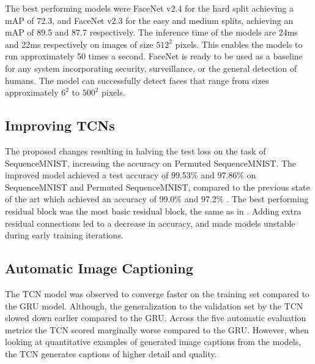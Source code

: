 \documentclass[a4paper, twoside]{article}
\begin{document}
The best performing models were FaceNet v2.4 for the hard split achieving a mAP of 72.3, and FaceNet v2.3 for the easy and medium splits, achieving an mAP of 89.5 and 87.7 respectively. The inference time of the models are 24ms and 22ms respectively on images of size $512^2$ pixels. This enables the models to run approximately 50 times a second. FaceNet is ready to be used as a baseline for any system incorporating security, surveillance, or the general detection of humans. The model can successfully detect faces that range from sizes approximately $6^2$ to $500^2$ pixels.

\subsection*{Improving TCNs}
The proposed changes resulting in halving the test loss on the task of SequenceMNIST, increasing the accuracy on Permuted SequenceMNIST. The improved model achieved a test accuracy of 99.53\% and 97.86\% on SequenceMNIST and Permuted SequenceMNIST, compared to the previous state of the art which achieved an accuracy of 99.0\% \cite{dilatedgru} and 97.2\% \cite{tcn}. The best performing residual block was the most basic residual block, the same as in \cite{tcn}. Adding extra residual connections led to a decrease in accuracy, and made models unstable during early training iterations.

\subsection*{Automatic Image Captioning}
The TCN model was observed to converge faster on the training set compared to the GRU model. Although, the generalization to the validation set by the TCN slowed down earlier compared to the GRU. Across the five automatic evaluation metrics the TCN scored marginally worse compared to the GRU. However, when looking at quantitative examples of generated image captions from the models, the TCN generates captions of higher detail and quality. 
\end{document}
